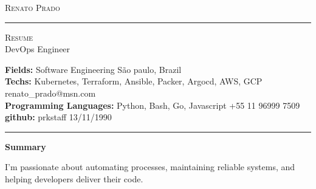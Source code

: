 \documentclass[10pt,A4]{article}
\newcommand{\cvsection}[1]
{
	\begin{center}
		\large\textcolor{sectcol}{\textbf{#1}}
	\end{center}
}
\newcommand{\metasection}[2]
{
\footnotesize{#2} \hspace*{\fill} \footnotesize{#1}\\[1pt]
}
\begin{document}
\pagestyle{fancy}	








\vspace{-8pt}
\begin{center}
	\HUGE \textsc{Renato Prado} \textcolor{sectcol}{\rule[-1mm]{1mm}{0.9cm}} \textsc{Resume}\\[2pt]
	\small DevOps Engineer
\end{center}



\vspace{6pt}


\metasection{São paulo, Brazil}{\textbf{Fields:} Software Engineering} 
\metasection{renato\_prado@msn.com}{\textbf{Techs:} Kubernetes, Terraform, Ansible, Packer, Argocd, AWS, GCP}
\metasection{+55 11 96999 7509}{\textbf{Programming Languages:} Python, Bash, Go, Javascript}
\metasection{13/11/1990}{\textbf{github:} prkstaff}
\vspace{-2pt}
\textcolor{softcol}{\hrule}
\vspace{6pt}

\normalsize

\vspace{-6pt}
\cvsection{Summary}
I'm passionate about automating processes, maintaining reliable systems, and helping developers deliver their code.\\
\end{document}

